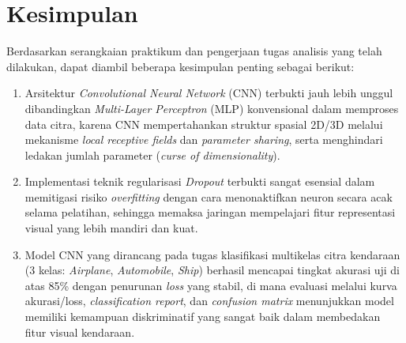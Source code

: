 \documentclass[12pt, a4paper]{article}
\begin{document}
\section{Kesimpulan}
Berdasarkan serangkaian praktikum dan pengerjaan tugas analisis yang telah dilakukan, dapat diambil beberapa kesimpulan penting sebagai berikut:
\begin{enumerate}
    \item Arsitektur \textit{Convolutional Neural Network} (CNN) terbukti jauh lebih unggul dibandingkan \textit{Multi-Layer Perceptron} (MLP) konvensional dalam memproses data citra, karena CNN mempertahankan struktur spasial 2D/3D melalui mekanisme \textit{local receptive fields} dan \textit{parameter sharing}, serta menghindari ledakan jumlah parameter (\textit{curse of dimensionality}).
    \item Implementasi teknik regularisasi \textit{Dropout} terbukti sangat esensial dalam memitigasi risiko \textit{overfitting} dengan cara menonaktifkan neuron secara acak selama pelatihan, sehingga memaksa jaringan mempelajari fitur representasi visual yang lebih mandiri dan kuat.
    \item Model CNN yang dirancang pada tugas klasifikasi multikelas citra kendaraan (3 kelas: \textit{Airplane}, \textit{Automobile}, \textit{Ship}) berhasil mencapai tingkat akurasi uji di atas 85\% dengan penurunan \textit{loss} yang stabil, di mana evaluasi melalui kurva akurasi/loss, \textit{classification report}, dan \textit{confusion matrix} menunjukkan model memiliki kemampuan diskriminatif yang sangat baik dalam membedakan fitur visual kendaraan.
\end{enumerate}
\newpage
\renewcommand{\refname}{\section{Daftar Pustaka}}


\end{document}
